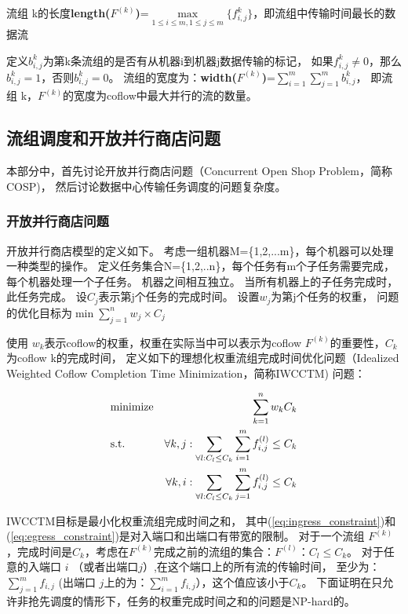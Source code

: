  \begin{definition}\label{defination-length}
流组 k的长度\textbf{length($F^{(k)}$)}=$\max \limits_{1 \leq i\leq m,1\leq j \leq m}\{ f^k_{i,j}\}$，即流组中传输时间最长的数据流
\end{definition}



 \begin{definition}\label{defination-width}
定义$b^k_{i,j}$为第k条流组的是否有从机器i到机器j数据传输的标记，
如果$f^k_{i,j}\ne 0$，那么$b^k_{i,j}=1$，否则$b^k_{i,j}=0$。
流组的宽度为：\textbf{width($F^{(k)}$)}=$\sum_{i=1}^m\sum_{j=1}^mb^k_{i,j}$，
即流组 k，$F^{(k)}$的宽度为coflow中最大并行的流的数量。
\end{definition}


\subsection{流组调度和开放并行商店问题}
本部分中，首先讨论开放并行商店问题（Concurrent Open Shop Problem，简称COSP)，
然后讨论数据中心传输任务调度的问题复杂度。
\subsubsection{开放并行商店问题}\label{concurrent-open-shop}
开放并行商店模型的定义如下。
考虑一组机器M=\{1,2,...m\}，每个机器可以处理一种类型的操作。
定义任务集合N=\{1,2,..n\}，每个任务有m个子任务需要完成，
每个机器处理一个子任务。
机器之间相互独立。
当所有机器上的子任务完成时，此任务完成。
设$C_j$表示第j个任务的完成时间。
设置$w_j$为第j个任务的权重，
问题的优化目标为$\mathop {\min }\sum_{j=1}^n w_j\times C_j$

使用 $w_k$表示coflow的权重，权重在实际当中可以表示为coflow $F^{(k)}$的重要性，$C_k$为coflow k的完成时间，
定义如下的理想化权重流组完成时间优化问题（Idealized Weighted Coflow Completion Time Minimization，简称IWCCTM) 问题：

\begin{eqnarray}
& {\rm minimize} & \sum_{k=1}^{n} w_{k} C_{k} \label{eq:WCCO-SC} \\
& {\rm s.t.} &\forall k,j:  \sum_{\forall l:C_l \leq C_k}\sum_{i=1}^{m}f_{i,j}^{(l)} \leq C_k  \label{eq:ingress_constraint}\\
&&\forall k,i: \sum_{\forall l:C_l \leq C_k}\sum_{j=1}^{m}f_{i,j}^{(l)} \leq C_k   \label{eq:egress_constraint}
\end{eqnarray}

IWCCTM目标是最小化权重流组完成时间之和，
其中(\ref{eq:ingress_constraint})和(\ref{eq:egress_constraint})是对入端口和出端口有带宽的限制。
对于一个流组 $F^{(k)}$，完成时间是$C_k$，考虑在$F^{(k)}$完成之前的流组的集合：$F^{(l)}$：$C_l \le C_k$。
对于任意的入端口 $i$ （或者出端口$j$）,在这个端口上的所有流的传输时间，
至少为：$\sum_{j=1}^{m}f_{i,j}$ (出端口 $j$上的为：$\sum_{i=1}^{m}f_{i,j}$），这个值应该小于$C_k$。
下面证明在只允许非抢先调度的情形下，任务的权重完成时间之和的问题是NP-hard的。

